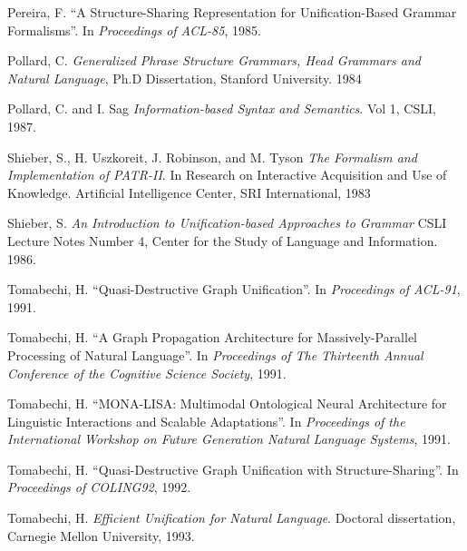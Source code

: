 \begin{thebibliography}{References}
Pereira, F.
``A Structure-Sharing Representation for Unification-Based
Grammar Formalisms''.
In {\it Proceedings of ACL-85}, 1985.

Pollard, C.
{\it Generalized Phrase Structure Grammars, Head Grammars and Natural
Language}, Ph.D Dissertation, Stanford University. 1984

Pollard, C. and I. Sag {\it Information-\-based
Syntax and Semantics}. Vol 1,  CSLI, 1987.






Shieber, S., H. Uszkoreit, J. Robinson, and M. Tyson
{\it The Formalism and Implementation of PATR-II}. In Research on 
Interactive Acquisition and Use of Knowledge.  Artificial Intelligence
Center, SRI International, 1983

Shieber, S.
{\it An Introduction to Unification-based Approaches to Grammar}
CSLI Lecture Notes Number 4, Center for the Study of Language and Information. 1986.



Tomabechi, H.
``Quasi-Destructive Graph Unification''.
In {\it Proceedings of ACL-91}, 1991.

Tomabechi, H.
``A Graph Propagation Architecture for Massively-Parallel Processing of
Natural Language''. In {\it Proceedings of The Thirteenth Annual
Conference of the Cognitive Science Society}, 1991.

Tomabechi, H.
``MONA-LISA: Multimodal Ontological Neural
Architecture for Linguistic Interactions and Scalable Adaptations''.
In {\it Proceedings of the International Workshop on Future Generation
Natural Language Systems}, 1991.

Tomabechi, H.
``Quasi-Destructive Graph Unification with Structure-Sharing''. In
{\it Proceedings of COLING92}, 1992.

Tomabechi, H.
{\it Efficient Unification for Natural Language}. Doctoral dissertation,
Carnegie Mellon University, 1993.


\end{thebibliography}

